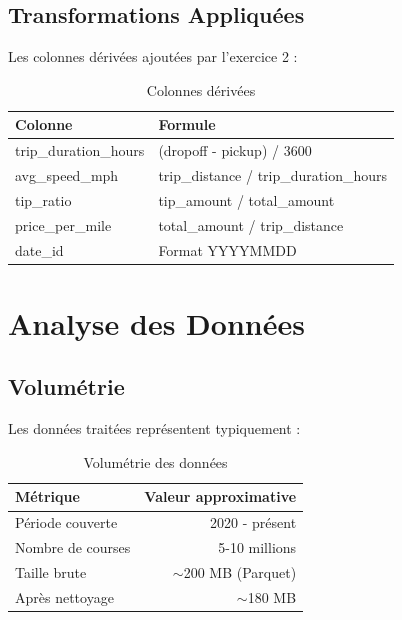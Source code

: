 \documentclass[12pt,a4paper]{report}
\begin{document}
\section{Transformations Appliquées}

Les colonnes dérivées ajoutées par l'exercice 2 :

\begin{table}[H]
\centering
\caption{Colonnes dérivées}
\begin{tabular}{@{}ll@{}}
\toprule
\textbf{Colonne} & \textbf{Formule} \\
\midrule
trip\_duration\_hours & (dropoff - pickup) / 3600 \\
avg\_speed\_mph & trip\_distance / trip\_duration\_hours \\
tip\_ratio & tip\_amount / total\_amount \\
price\_per\_mile & total\_amount / trip\_distance \\
date\_id & Format YYYYMMDD \\
\bottomrule
\end{tabular}
\end{table}

\chapter{Analyse des Données}

\section{Volumétrie}

Les données traitées représentent typiquement :

\begin{table}[H]
\centering
\caption{Volumétrie des données}
\begin{tabular}{@{}lr@{}}
\toprule
\textbf{Métrique} & \textbf{Valeur approximative} \\
\midrule
Période couverte & 2020 - présent \\
Nombre de courses & 5-10 millions \\
Taille brute & $\sim$200 MB (Parquet) \\
Après nettoyage & $\sim$180 MB \\
\bottomrule
\end{tabular}
\end{table}
\end{document}
